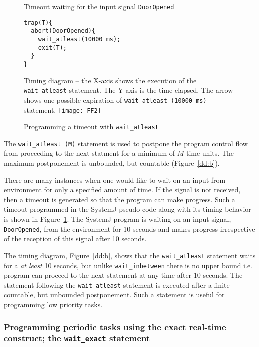 \begin{figure}[b!]
	\centering
	\vspace{-10pt}
        \begin{SubFloat}{\label{dd:a}Timeout waiting for the input
            signal \texttt{DoorOpened}}
        \begin{lstlisting}[style=sysj,morekeywords={abort,await,emit,present,trap,pause,exit,wait_atleast,suspend}]
trap(T){
  abort(DoorOpened){
    wait_atleast(10000 ms);
    exit(T);  
  }
}
\end{lstlisting}
\end{SubFloat}
\begin{SubFloat}{\label{dd:b}Timing diagram -- the X-axis shows the
    execution of the \texttt{wait\_atleast} statement. The Y-axis is the
    time elapsed. The arrow shows one possible expiration of
    \texttt{wait\_atleast (10000 ms)} statement.}
\texttt{[image: FF2]}
\end{SubFloat}
\caption{Programming a timeout with \texttt{wait\_atleast}}
\label{dd}
\end{figure}

The \texttt{wait\_atleast (M)} statement is used to postpone the program
control flow from proceeding to the next statment for a minimum of $M$
time units. The maximum postponement is unbounded, but countable
(Figure~\ref{dd:b}).

There are many instances when one would like to wait on an input from
environment for only a specified amount of time. If the signal is not
received, then a timeout is generated so that the program can make
progress. Such a timeout programmed in the SystemJ pseudo-code along
with its timing behavior is shown in Figure~\ref{dd}. The SystemJ
program is waiting on an input signal, \texttt{DoorOpened}, from the
environment for 10 seconds and makes progress irrespective of the
reception of this signal after 10 seconds.

The timing diagram, Figure~\ref{dd:b}, shows that the
\texttt{wait\_atleast} statement waits for a \textit{at least} 10
seconds, but unlike \texttt{wait\_inbetween} there is no upper bound
i.e. program can proceed to the next statement at any time after 10
seconds. The statement following the \texttt{wait\_atleast} statement is
executed after a finite countable, but unbounded postponement. Such a
statement is useful for programming low priority tasks.


\subsubsection{Programming periodic tasks using the exact real-time
  construct; the \texttt{wait\_exact} statement}
\label{sec:progr-using-exact}

